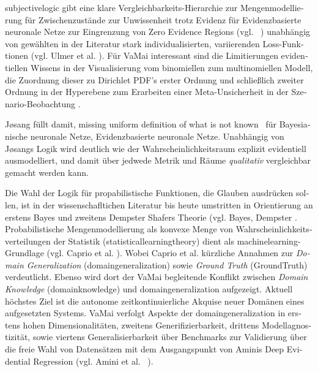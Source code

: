 \begin{otherlanguage}{ngerman}
\gls{subjectivelogic} gibt eine klare Vergleichbarkeits-Hierarchie zur Mengenmodellierung für Zwischenzustände zur Unwissenheit trotz Evidenz für \gls{Evidenzbasierte neuronale Netze} zur Eingrenzung von \glqq Zero Evidence Regions \grqq{} (vgl. ~\parencite[{vgl. S.50}]{josang2016subjective}) unabhängig von gewählten in der Literatur stark individualisierten, variierenden Loss-Funktionen (vgl. Ulmer et al. \parencite{Ulmer2023}). Für VaMai interessant sind die Limitierungen evidentiellen Wissens in der Visualisierung vom binomiellen zum multinomiellen Modell, die Zuordnung dieser zu Dirichlet PDF's erster Ordnung und schließlich zweiter Ordnung in der Hyperebene zum Erarbeiten einer Meta-Unsicherheit \parencite[{S.39, 3.6.1 \glqq hyper-opinion representation\grqq, \glqq hyper-opinion and dirichlet HPDF \grqq}]{josang2016subjective} in der Szenario-Beobachtung \parencite[{S.39, Tabelle 3.3}]{josang2016subjective}. 

J\o{}sang füllt damit, \glqq [the] missing uniform definition of what is not known\grqq ~\parencite[{vgl. S.42}]{josang2016subjective} für \gls{Bayesianische neuronale Netze}, \gls{Evidenzbasierte neuronale Netze}. Unabhängig von J\o{}sangs Logik wird deutlich wie der Wahrscheinlichkeitsraum explizit evidentiell ausmodelliert, und damit über jedwede Metrik und Räume \textit{qualitativ} vergleichbar gemacht werden kann.  

Die Wahl der Logik für propabilistische Funktionen, die Glauben ausdrücken sollen, ist in der wissenschafltichen Literatur bis heute umstritten in Orientierung an erstens Bayes und zweitens Dempster Shafers Theorie (vgl. Bayes, Dempster \parencite{bayes1763essay, dempster1967upper, shafer1976mathematical}. Probabilistische Mengenmodellierung als konvexe Menge von Wahrscheinlichkeitsverteilungen der Statistik (\gls{statisticallearningtheory}) dient als \gls{machinelearning}-Grundlage (vgl. Caprio et al. \parencite{caprio2024credal}). Wobei Caprio et al. kürzliche Annahmen zur \textit{Domain Generalization} (\gls{domaingeneralization}) sowie \textit{Ground Truth} (\gls{GroundTruth}) verdeutlicht. Ebenso wird dort der VaMai begleitende Konflikt zwischen \textit{Domain Knowledge} (\gls{domainknowledge}) und \gls{domaingeneralization} aufgezeigt. Aktuell höchstes Ziel ist die autonome zeitkontinuierliche Akquise neuer Domänen eines aufgesetzten Systems. VaMai verfolgt Aspekte der \gls{domaingeneralization} in erstens hohen Dimensionalitäten, zweitens Generifizierbarkeit, drittens Modellagnostizität, sowie viertens Generalisierbarkeit über Benchmarks zur Validierung über die freie Wahl von Datensätzen mit dem Ausgangspunkt von Aminis Deep Evidential Regression (vgl. Amini et al. ~\parencite{amini2020deep}).


\end{otherlanguage}
